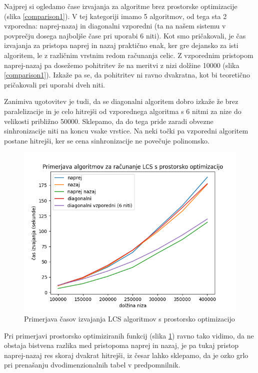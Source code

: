 \documentclass[a4paper,12pt,openright]{book}
\begin{document}
Najprej si ogledamo čase izvajanja za algoritme brez prostorske optimizacije (slika \ref{comparison1}). V tej kategoriji imamo 5 algoritmov, od tega sta 2 vzporedna: naprej-nazaj in diagonalni vzporedni (ta na našem sistemu v povprečju dosega najboljše čase pri uporabi 6 niti). Kot smo pričakovali, je čas izvajanja za pristopa naprej in nazaj praktično enak, ker gre dejansko za isti algoritem, le z različnim vrstnim redom računanja celic. Z vzporednim pristopom naprej-nazaj pa dosežemo pohitritev že na meritvi z nizi dolžine 10000 (slika \ref{comparison1}). Izkaže pa se, da pohitritev ni ravno dvakratna, kot bi teoretično pričakovali pri uporabi dveh niti. 

Zanimiva ugotovitev je tudi, da se diagonalni algoritem dobro izkaže že brez paralelizacije in je celo hitrejši od vzporednega algoritma s 6 nitmi za nize do velikosti približno 50000. Sklepamo, da do tega pride zaradi obvezne sinhronizacije niti na koncu vsake vrstice. Na neki točki pa vzporedni algoritem postane hitrejši, ker se cena sinhronizacije ne povečuje polinomsko.  

\begin{figure}[H]
\centering
\includegraphics[width=1.0\textwidth]{plots/LCSspace.png}
\caption{Primerjava časov izvajanja LCS algoritmov s prostorsko optimizacijo}
\label{comparison2}
\end{figure}


Pri primerjavi prostorsko optimiziranih funkcij (slika \ref{comparison2}) ravno tako vidimo, da ne obstaja bistvena razlika med pristopoma naprej in nazaj, je pa tukaj pristop naprej-nazaj res skoraj dvakrat hitrejši, iz česar lahko sklepamo, da je ozko grlo pri prenašanju dvodimenzionalnih tabel v predpomnilnik. 
\end{document}
